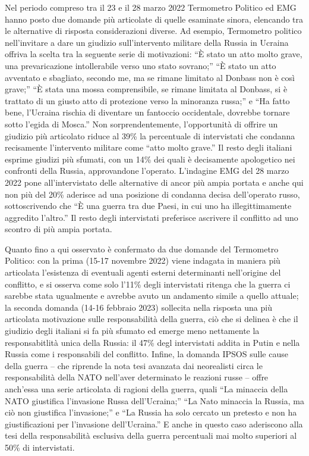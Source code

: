 \documentclass[
  openany]{book}
\begin{document}
Nel periodo compreso tra il 23 e il 28 marzo 2022 Termometro Politico ed EMG hanno posto due domande più articolate di quelle esaminate sinora, elencando tra le alternative di risposta considerazioni diverse. Ad esempio, Termometro politico nell'invitare a dare un giudizio sull'intervento militare della Russia in Ucraina offriva la scelta tra la seguente serie di motivazioni: ``È stato un atto molto grave, una prevaricazione intollerabile verso uno stato sovrano;'' ``È stato un atto avventato e sbagliato, secondo me, ma se rimane limitato al Donbass non è così grave;'' ``È stata una mossa comprensibile, se rimane limitata al Donbass, si è trattato di un giusto atto di protezione verso la minoranza russa;'' e ``Ha fatto bene, l'Ucraina rischia di diventare un fantoccio occidentale, dovrebbe tornare sotto l'egida di Mosca.'' Non sorprendentemente, l'opportunità di offrire un giudizio più articolato riduce al 39\% la percentuale di intervistati che condanna recisamente l'intervento militare come ``atto molto grave.'' Il resto degli italiani esprime giudizi più sfumati, con un 14\% dei quali è decisamente apologetico nei confronti della Russia, approvandone l'operato. L'indagine EMG del 28 marzo 2022 pone all'intervistato delle alternative di ancor più ampia portata e anche qui non più del 20\% aderisce ad una posizione di condanna decisa dell'operato russo, sottoscrivendo che ``È una guerra tra due Paesi, in cui uno ha illegittimamente aggredito l'altro.'' Il resto degli intervistati preferisce ascrivere il conflitto ad uno scontro di più ampia portata.

Quanto fino a qui osservato è confermato da due domande del Termometro Politico: con la prima (15-17 novembre 2022) viene indagata in maniera più articolata l'esistenza di eventuali agenti esterni determinanti nell'origine del conflitto, e si osserva come solo l'11\% degli intervistati ritenga che la guerra ci sarebbe stata ugualmente e avrebbe avuto un andamento simile a quello attuale; la seconda domanda (14-16 febbraio 2023) sollecita nella risposta una più articolata motivazione sulle responsabilità della guerra, ciò che si delinea è che il giudizio degli italiani si fa più sfumato ed emerge meno nettamente la responsabitlità unica della Russia: il 47\% degl intervistati addita in Putin e nella Russia come i responsabili del conflitto. Infine, la domanda IPSOS sulle cause della guerra -- che riprende la nota tesi avanzata dai neorealisti circa le responsabilità della NATO nell'aver determinato le reazioni russe -- offre anch'essa una serie articolata di ragioni della guerra, quali ``La minaccia della NATO giustifica l'invasione Russa dell'Ucraina;'' ``La Nato minaccia la Russia, ma ciò non giustifica l'invasione;'' e ``La Russia ha solo cercato un pretesto e non ha giustificazioni per l'invasione dell'Ucraina.'' E anche in questo caso aderiscono alla tesi della responsabilità esclusiva della guerra percentuali mai molto superiori al 50\% di intervistati.
\end{document}
